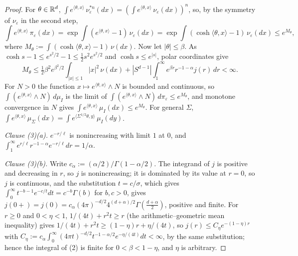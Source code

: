 \begin{proof}
For $\theta \in \mathbb{R}^d$, $\int e^{\langle\theta,x\rangle}\,\nu_\varepsilon^{*n}(dx) =
(\int e^{\langle\theta,x\rangle}\,\nu_\varepsilon(dx))^n$, so, by the symmetry of $\nu_\varepsilon$
in the second step,
\[
  \int e^{\langle\theta,x\rangle}\,\pi_\varepsilon(dx)
  = \exp\int(e^{\langle\theta,x\rangle} - 1)\,\nu_\varepsilon(dx)
  = \exp\int(\cosh\langle\theta,x\rangle - 1)\,\nu_\varepsilon(dx) \le e^{M_\theta} ,
\]
where $M_\theta := \int(\cosh\langle\theta,x\rangle - 1)\,\nu(dx)$. Now let $|\theta| \le \beta$. As
$\cosh s - 1 \le e^{s^2/2} - 1 \le \tfrac12s^2e^{s^2/2}$ and $\cosh s \le e^{|s|}$, polar coordinates
give
\[
  M_\theta \le \tfrac12\beta^2e^{\beta^2/2}\int_{|x|\le1}|x|^2\,\nu(dx)
  + |S^{d-1}|\int_1^\infty e^{\beta r}r^{-1-\alpha}j(r)\,dr < \infty .
\]
For $N > 0$ the function $x \mapsto e^{\langle\theta,x\rangle} \wedge N$ is bounded and continuous, so
$\int(e^{\langle\theta,x\rangle} \wedge N)\,d\mu_I$ is the limit of
$\int(e^{\langle\theta,x\rangle} \wedge N)\,d\pi_\varepsilon \le e^{M_\theta}$, and monotone
convergence in $N$ gives $\int e^{\langle\theta,x\rangle}\,\mu_I(dx) \le e^{M_\theta}$. For general
$\Sigma$, $\int e^{\langle\theta,x\rangle}\,\mu_\Sigma(dx) =
\int e^{\langle\Sigma^{1/2}\theta,y\rangle}\,\mu_I(dy)$.

\emph{Clause (3)(a).} $e^{-r/\ell}$ is nonincreasing with limit $1$ at $0$, and
$\int_1^\infty e^{r/\ell}r^{-1-\alpha}e^{-r/\ell}dr = 1/\alpha$.

\emph{Clause (3)(b).} Write $c_\alpha := (\alpha/2)/\Gamma(1-\alpha/2)$. The integrand of $j$ is
positive and decreasing in $r$, so $j$ is nonincreasing; it is dominated by its value at $r = 0$, so
$j$ is continuous, and the substitution $t = c/\sigma$, which gives
$\int_0^\infty t^{-b-1}e^{-c/t}dt = c^{-b}\Gamma(b)$ for $b, c > 0$, gives
$j(0{+}) = j(0) = c_\alpha(4\pi)^{-d/2}4^{(d+\alpha)/2}\Gamma(\tfrac{d+\alpha}{2})$, positive and
finite. For $r \ge 0$ and $0 < \eta < 1$, $1/(4t) + r^2t \ge r$ (the arithmetic--geometric mean
inequality) gives $1/(4t) + r^2t \ge (1-\eta)r + \eta/(4t)$, so $j(r) \le C_\eta e^{-(1-\eta)r}$ with
$C_\eta := c_\alpha\int_0^\infty(4\pi t)^{-d/2}t^{-1-\alpha/2}e^{-\eta/(4t)}dt < \infty$, by the same
substitution; hence the integral of (2) is finite for $0 < \beta < 1 - \eta$, and $\eta$ is arbitrary.


\end{proof}
